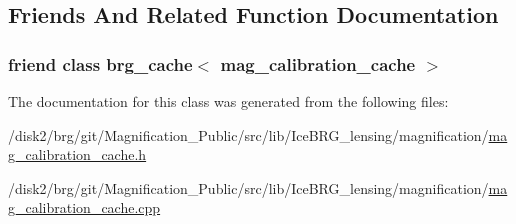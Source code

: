 \subsection{Friends And Related Function Documentation}
\hypertarget{classIceBRG_1_1mag__calibration__cache_aee5820d4cd188a3af58576bafc2fc246}{
\subsubsection[{brg\-\_\-cache$<$ mag\-\_\-calibration\-\_\-cache $>$}]{\setlength{\rightskip}{0pt plus 5cm}friend class {\bf brg\-\_\-cache}$<$ {\bf mag\-\_\-calibration\-\_\-cache} $>$\hspace{0.3cm}{\ttfamily [friend]}}}\label{classIceBRG_1_1mag__calibration__cache_aee5820d4cd188a3af58576bafc2fc246}


The documentation for this class was generated from the following files\-:\begin{DoxyCompactItemize}
\item 
/disk2/brg/git/\-Magnification\-\_\-\-Public/src/lib/\-Ice\-B\-R\-G\-\_\-lensing/magnification/\hyperlink{mag__calibration__cache_8h}{mag\-\_\-calibration\-\_\-cache.\-h}\item 
/disk2/brg/git/\-Magnification\-\_\-\-Public/src/lib/\-Ice\-B\-R\-G\-\_\-lensing/magnification/\hyperlink{mag__calibration__cache_8cpp}{mag\-\_\-calibration\-\_\-cache.\-cpp}\end{DoxyCompactItemize}
